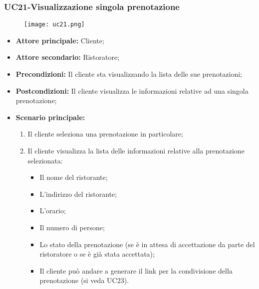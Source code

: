 \subsubsection{UC21-Visualizzazione singola prenotazione}
\begin{figure}[h] \texttt{[image: uc21.png]} \end{figure}
\begin{itemize}
    \item \textbf{Attore principale:} Cliente;
    \item \textbf{Attore secondario:} Ristoratore;
    \item \textbf{Precondizioni:} Il cliente sta visualizzando la lista delle sue prenotazioni;
    \item \textbf{Postcondizioni:} Il cliente visualizza le informazioni relative ad una singola prenotazione;
    \item \textbf{Scenario principale:}
        \begin{enumerate}
            \item Il cliente seleziona una prenotazione in particolare;
            \item Il cliente visualizza la lista delle informazioni relative alla prenotazione selezionata:
            \begin{itemize}
                \item Il nome del ristorante;
                \item L'indirizzo del ristorante;
                \item L'orario;
                \item Il numero di persone;
                \item Lo stato della prenotazione (se è in attesa di accettazione da parte del ristoratore o se è già stata accettata);
            \item Il cliente può andare a generare il link per la condivisione della prenotazione (si veda UC23).
            \end{itemize}
        \end{enumerate}
\end{itemize}

\pagebreak
